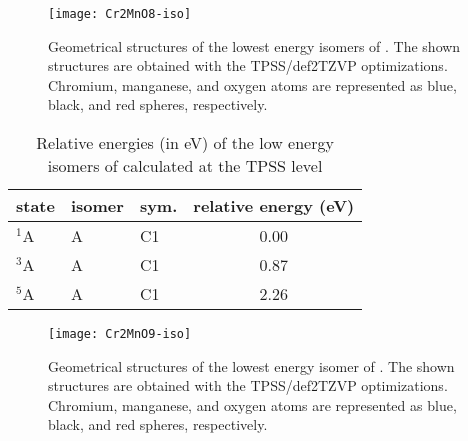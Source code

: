 \begin{figure}
	\centering
	\texttt{[image: Cr2MnO8-iso]}
	\caption{Geometrical structures of the lowest energy isomers of . The shown structures are obtained with the TPSS/def2TZVP optimizations. Chromium, manganese, and oxygen atoms are represented as blue, black, and red spheres, respectively.}
	\label{figs:Cr2MnO8}
\end{figure}





\begin{table}[]
	\centering
	\caption{Relative energies (in eV) of the low energy isomers of  calculated at the TPSS level}
	\begin{tabular}{@{}lllc@{}}
	\toprule
	state & isomer & sym. & relative energy (eV) \\ \midrule
	$^1$A    & A      & C1   & 0.00                 \\
	$^3$A    & A      & C1   & 0.87                 \\
	$^5$A    & A      & C1   & 2.26                 \\ \bottomrule
	\end{tabular}
\end{table}



\begin{figure}
	\centering
	\texttt{[image: Cr2MnO9-iso]}
	\caption{Geometrical structures of the lowest energy isomer of . The shown structures are obtained with the TPSS/def2TZVP optimizations. Chromium, manganese, and oxygen atoms are represented as blue, black, and red spheres, respectively.}
	\label{figs:Cr2MnO8}
\end{figure}








